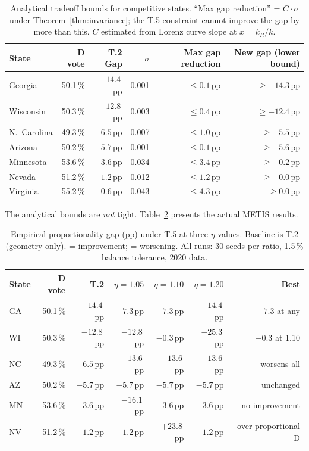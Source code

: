 \begin{table}[h]
\centering
\caption{Analytical tradeoff bounds for competitive states.
``Max gap reduction'' = $C \cdot \sigma$ under Theorem~\ref{thm:invariance};
the T.5 constraint cannot improve the gap by more than this.
$C$ estimated from Lorenz curve slope at $x = k_R/k$.}
\label{tab:tradeoff}
\small
\begin{tabular}{lrrrrr}
\toprule
State & D vote & T.2 Gap & $\sigma$ & Max gap reduction & New gap (lower bound) \\
\midrule
Georgia       & 50.1\,\% & $-14.4$\,pp & 0.001 & $\leq 0.1$\,pp & $\geq -14.3$\,pp \\
Wisconsin     & 50.3\,\% & $-12.8$\,pp & 0.003 & $\leq 0.4$\,pp & $\geq -12.4$\,pp \\
N.\ Carolina  & 49.3\,\% &  $-6.5$\,pp & 0.007 & $\leq 1.0$\,pp & $\geq -5.5$\,pp \\
Arizona       & 50.2\,\% &  $-5.7$\,pp & 0.001 & $\leq 0.1$\,pp & $\geq -5.6$\,pp \\
Minnesota     & 53.6\,\% &  $-3.6$\,pp & 0.034 & $\leq 3.4$\,pp & $\geq -0.2$\,pp \\
Nevada        & 51.2\,\% &  $-1.2$\,pp & 0.012 & $\leq 1.2$\,pp & $\geq -0.0$\,pp \\
Virginia      & 55.2\,\% &  $-0.6$\,pp & 0.043 & $\leq 4.3$\,pp & $\geq  0.0$\,pp \\
\bottomrule
\end{tabular}
\end{table}

\noindent The analytical bounds are \emph{not} tight.
Table~\ref{tab:tradeoff-empirical} presents the actual METIS results.

\begin{table}[h]
\centering
\caption{Empirical proportionality gap (pp) under T.5 at three $\eta$ values.
Baseline is T.2 (geometry only). \textuparrow{} = improvement; \textdownarrow{} = worsening.
All runs: 30 seeds per ratio, 1.5\,\% balance tolerance, 2020 data.}
\label{tab:tradeoff-empirical}
\begin{tabular}{lrrrrrr}
\toprule
State & D vote & T.2 & $\eta=1.05$ & $\eta=1.10$ & $\eta=1.20$ & Best \\
\midrule
GA & 50.1\,\% & $-14.4$\,pp & $-7.3$\,pp & $-7.3$\,pp & $-14.4$\,pp & $-7.3$ at any \\
WI & 50.3\,\% & $-12.8$\,pp & $-12.8$\,pp & $-0.3$\,pp & $-25.3$\,pp & $-0.3$ at 1.10 \\
NC & 49.3\,\% & $-6.5$\,pp  & $-13.6$\,pp & $-13.6$\,pp & $-13.6$\,pp & worsens all \\
AZ & 50.2\,\% & $-5.7$\,pp  & $-5.7$\,pp  & $-5.7$\,pp  & $-5.7$\,pp  & unchanged \\
MN & 53.6\,\% & $-3.6$\,pp  & $-16.1$\,pp & $-3.6$\,pp & $-3.6$\,pp & no improvement \\
NV & 51.2\,\% & $-1.2$\,pp  & $-1.2$\,pp  & $+23.8$\,pp & $-1.2$\,pp  & over-proportional D \\
\bottomrule
\end{tabular}
\end{table}

